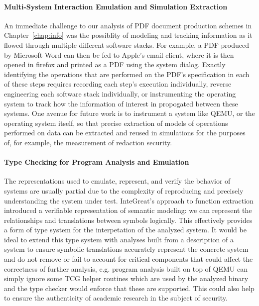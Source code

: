 \paragraph{Multi-System Interaction Emulation and Simulation Extraction}
An immediate challenge to our analysis of PDF document production schemes in Chapter~\ref{chap:info} was the possiblity of modeling and tracking information as it flowed through multiple different software stacks.
For example, a PDF produced by Microsoft Word can then be fed to Apple's email client, where it is then opened in firefox and printed as a PDF using the system dialog.
Exactly identifying the operations that are performed on the PDF's specification in each of these steps requires recording each step's execution individually, reverse engineering each software stack individually, or instrumenting the operating system to track how the information of interest in propogated between these systems.
One avenue for future work is to instrument a system like QEMU, or the operating system itself, so that precise extraction of models of operations performed on data can be extracted and reused in simulations for the purposes of, for example, the measurement of redaction security.

\paragraph{Type Checking for Program Analysis and Emulation}
The representations used to emulate, represent, and verify the behavior of systems are usually partial due to the complexity of reproducing and precisely understanding the system under test.
InteGreat's approach to function extraction introduced a verifiable representation of semantic modeling: we can represent the relationships and translations between symbols logically.
This effectively provides a form of type system for the interpetation of the analyzed system.
It would be ideal to extend this type system with analyses built from a description of a system to ensure symbolic translations accurately represent the concrete system and do not remove or fail to account for critical components that could affect the correctness of further analysis, e.g. program analysis built on top of QEMU can simply ignore some TCG helper routines which are used by the analyzed binary and the type checker would enforce that these are supported.
This could also help to ensure the authenticity of academic research in the subject of security.

